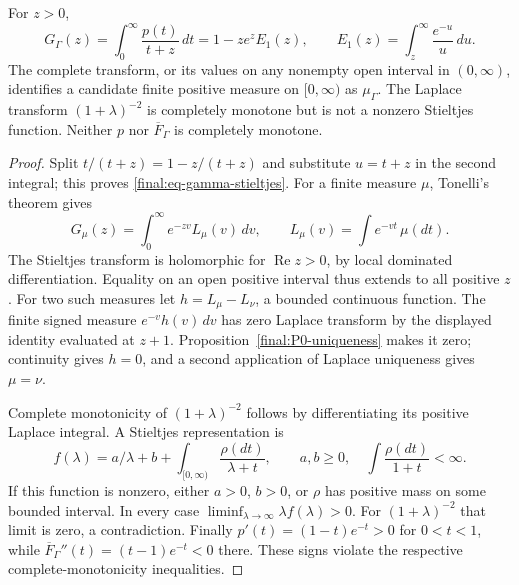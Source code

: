 \begin{proposition}
\label{final:P5-stieltjes}
For $z>0$,
\begin{equation}
 G_\Gamma(z)=\int_0^\infty\frac{p(t)}{t+z}\,dt
 =1-z e^z E_1(z),\qquad
 E_1(z)=\int_z^\infty\frac{e^{-u}}u\,du.
 \label{final:eq-gamma-stieltjes}
\end{equation}
The complete transform, or its values on any nonempty open interval
in $(0,\infty)$, identifies a candidate finite positive measure on
$[0,\infty)$ as $\mu_\Gamma$.
The Laplace transform $(1+\lambda)^{-2}$ is completely monotone
but is not a nonzero Stieltjes function.  Neither $p$ nor
$\overline F_\Gamma$ is completely monotone.
\end{proposition}
\begin{proof}
Split $t/(t+z)=1-z/(t+z)$ and substitute $u=t+z$ in the second
integral; this proves \eqref{final:eq-gamma-stieltjes}.
For a finite measure $\mu$, Tonelli's theorem gives
\[
 G_\mu(z)=\int_0^\infty e^{-zv}L_\mu(v)\,dv,
 \qquad L_\mu(v)=\int e^{-vt}\,\mu(dt).
\]
The Stieltjes transform is holomorphic for $\operatorname{Re}z>0$,
by local dominated differentiation.  Equality on an open positive
interval thus extends to all positive $z$.  For two such measures
let $h=L_\mu-L_\nu$, a bounded continuous function.  The finite signed
measure $e^{-v}h(v)\,dv$ has zero Laplace transform by the displayed
identity evaluated at $z+1$.  Proposition~\ref{final:P0-uniqueness}
makes it zero; continuity gives $h=0$, and a second application of
Laplace uniqueness gives $\mu=\nu$.

Complete monotonicity of $(1+\lambda)^{-2}$ follows by differentiating
its positive Laplace integral.  A Stieltjes representation is
\[
 f(\lambda)=a/\lambda+b+
 \int_{[0,\infty)}\frac{\rho(dt)}{\lambda+t},
 \qquad a,b\geq0,\quad
 \int\frac{\rho(dt)}{1+t}<\infty.
\]
If this function is nonzero, either $a>0$, $b>0$, or $\rho$ has
positive mass on some bounded interval.  In every case
$\liminf_{\lambda\to\infty}\lambda f(\lambda)>0$.
For $(1+\lambda)^{-2}$ that limit is zero, a contradiction.
Finally $p'(t)=(1-t)e^{-t}>0$ for $0<t<1$, while
$\overline F_\Gamma''(t)=(t-1)e^{-t}<0$ there.  These signs violate
the respective complete-monotonicity inequalities.
\end{proof}

